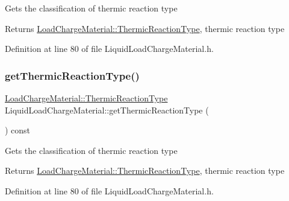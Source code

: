 Gets the classification of thermic reaction type \begin{DoxyReturn}{Returns}
\hyperlink{class_load_charge_material_a51d4263e865a5d86236622dd3fe23fd1}{Load\+Charge\+Material\+::\+Thermic\+Reaction\+Type}, thermic reaction type 
\end{DoxyReturn}


Definition at line 80 of file Liquid\+Load\+Charge\+Material.\+h.

\mbox{\label{class_liquid_load_charge_material_a181337f5e5cf6a47b82dd56897b49c29}} 
\subsubsection{\texorpdfstring{get\+Thermic\+Reaction\+Type()}{getThermicReactionType()}\hspace{0.1cm}{\footnotesize\ttfamily [2/3]}}
{\footnotesize\ttfamily \hyperlink{class_load_charge_material_a51d4263e865a5d86236622dd3fe23fd1}{Load\+Charge\+Material\+::\+Thermic\+Reaction\+Type} Liquid\+Load\+Charge\+Material\+::get\+Thermic\+Reaction\+Type (\begin{DoxyParamCaption}{ }\end{DoxyParamCaption}) const\hspace{0.3cm}{\ttfamily [inline]}}

Gets the classification of thermic reaction type \begin{DoxyReturn}{Returns}
\hyperlink{class_load_charge_material_a51d4263e865a5d86236622dd3fe23fd1}{Load\+Charge\+Material\+::\+Thermic\+Reaction\+Type}, thermic reaction type 
\end{DoxyReturn}


Definition at line 80 of file Liquid\+Load\+Charge\+Material.\+h.

\mbox{\label{class_liquid_load_charge_material_a181337f5e5cf6a47b82dd56897b49c29}} 
